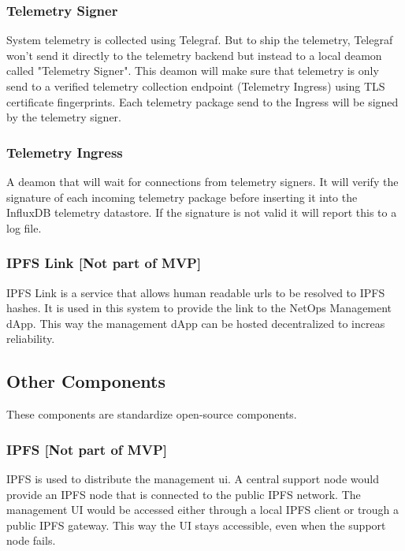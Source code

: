 \subsubsection{Telemetry Signer}

System telemetry is collected using Telegraf. But to ship the telemetry, Telegraf won't send it directly to the telemetry backend but instead to a local deamon called "Telemetry Signer".
This deamon will make sure that telemetry is only send to a verified telemetry collection endpoint (Telemetry Ingress) using TLS certificate fingerprints.
Each telemetry package send to the Ingress will be signed by the telemetry signer.

\subsubsection{Telemetry Ingress}

A deamon that will wait for connections from telemetry signers. It will verify the signature of each incoming telemetry package before inserting it into the InfluxDB telemetry datastore. If the signature is not valid it will report this to a log file.

\subsubsection{IPFS Link [Not part of MVP]}

IPFS Link is a service that allows human readable urls to be resolved to IPFS hashes. It is used in this system to provide the link to the NetOps Management dApp. This way the management dApp can be hosted decentralized to increas reliability.

\subsection{Other Components}

These components are standardize open-source components.

\subsubsection{IPFS [Not part of MVP]}

IPFS is used to distribute the management ui. A central support node would provide an IPFS node that is connected to the public IPFS network. The management UI would be accessed either through a local IPFS client or trough a public IPFS gateway.
This way the UI stays accessible, even when the support node fails.

